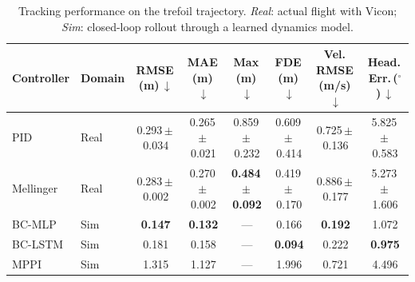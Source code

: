 \begin{table}[t]
\caption{Tracking performance on the trefoil trajectory. \emph{Real}: actual flight with Vicon; \emph{Sim}: closed-loop rollout through a learned dynamics model.}
\label{tab:task2_combined}
\centering
\setlength{\tabcolsep}{4pt}
\begin{tabular}{llcccccc}
\toprule
Controller & Domain & RMSE\,(m)\,$\downarrow$ & MAE\,(m)\,$\downarrow$ & Max\,(m)\,$\downarrow$ & FDE\,(m)\,$\downarrow$ & Vel.\,RMSE\,(m/s)\,$\downarrow$ & Head.\,Err.\,($^\circ$)\,$\downarrow$ \\
\midrule
PID & Real & 0.293\,{\scriptsize$\pm$\,0.034} & 0.265\,{\scriptsize$\pm$\,0.021} & 0.859\,{\scriptsize$\pm$\,0.232} & 0.609\,{\scriptsize$\pm$\,0.414} & 0.725\,{\scriptsize$\pm$\,0.136} & 5.825\,{\scriptsize$\pm$\,0.583} \\
Mellinger & Real & 0.283\,{\scriptsize$\pm$\,0.002} & 0.270\,{\scriptsize$\pm$\,0.002} & \textbf{0.484\,{\scriptsize$\pm$\,0.092}} & 0.419\,{\scriptsize$\pm$\,0.170} & 0.886\,{\scriptsize$\pm$\,0.177} & 5.273\,{\scriptsize$\pm$\,1.606} \\
\midrule
BC-MLP & Sim & \textbf{0.147} & \textbf{0.132} & --- & 0.166 & \textbf{0.192} & 1.072 \\
BC-LSTM & Sim & 0.181 & 0.158 & --- & \textbf{0.094} & 0.222 & \textbf{0.975} \\
MPPI & Sim & 1.315 & 1.127 & --- & 1.996 & 0.721 & 4.496 \\
\bottomrule
\end{tabular}
\end{table}